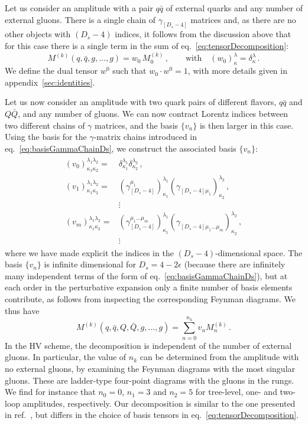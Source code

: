 Let us consider an amplitude with a pair $q\bar q$ of external
quarks and any number of external gluons. There is a single
chain of $\gamma_{[D_s-4]}$ matrices and,
as there are no other objects with $(D_s-4)$ indices, it
follows from the discussion above that
for this case there is a single term in the sum of
eq.~\eqref{eq:tensorDecomposition}:
\begin{equation}\label{eq:decompqqbar}
	M^{(k)}
	(q,\bar q,g,\ldots,g)
	=w_0\,M^{(k)}_0\,,\qquad
	\textrm{with}\quad
	(w_0)_{\kappa}^{\lambda}=\delta_{\kappa}^{\lambda}\,.
\end{equation}
We define the dual tensor
$w^0$ such that $w_0\cdot w^0=1$, with more details given in
appendix~\ref{sec:identities}.

Let us now consider an amplitude with two quark pairs of 
different flavors, $q\bar q$ and $Q\bar Q$, and any number of
gluons. We can now contract Lorentz indices between two 
different chains of $\gamma$ matrices, and the basis 
$\{v_n\}$ is then larger in this case. Using the basis for the
$\gamma$-matrix chains introduced in 
eq.~\eqref{eq:basisGammaChainDs}, we construct the associated
basis $\{v_n\}$:
\begin{align}
  \begin{split} \label{eqn:4qtensors}
    (v_0)_{\kappa_1\kappa_2}^{\lambda_1\lambda_2}   = &
    \delta_{\kappa_1}^{\lambda_1} \delta_{\kappa_2}^{\lambda_2}\,, \\
    (v_1)_{\kappa_1\kappa_2}^{\lambda_1\lambda_2}=
    &(\gamma_{[D_s-4]}^{\mu_1} )_{\kappa_1}^{\lambda_1} 
    (\gamma_{[D_s-4]\mu_1}^{\phantom{\mu}})_{\kappa_2}^{\lambda_2}\,, \\
    & \vdots\\
    (v_m)_{\kappa_1\kappa_2}^{\lambda_1\lambda_2}=
    &(\gamma_{[D_s-4]}^{\mu_1 \ldots  \mu_m})_{\kappa_1}^{\lambda_1}
    (\gamma_{[D_s-4]\mu_1 \ldots \mu_m}^{\phantom{\mu}})_{\kappa_2}^{\lambda_2}\,,\\
    & \vdots\,
  \end{split}
\end{align}
where we have made explicit the indices in the $
(D_s-4)$-dimensional space.
The basis $\{v_n\}$ is infinite dimensional for
$D_s=4-2\epsilon$ (because there are infinitely many independent
terms of the form of eq.~\eqref{eq:basisGammaChainDs}), but at
each order in the perturbative
expansion only a finite number of basis elements contribute, 
as follows from inspecting the corresponding Feynman diagrams.
We thus have
\begin{equation} \label{eqn:4qampltensor}
	M^{(k)} (q,\bar q,Q,\bar Q,g,\ldots,g) =\sum_{n=0}^{n_k} v_n M^{(k)}_n\,.
\end{equation}
In the HV scheme, the decomposition is independent of the number
of external gluons. In particular,
the value of $n_k$ can be determined from the amplitude with no 
external gluons, by examining the Feynman diagrams
with the most singular gluons. 
These are ladder-type four-point diagrams with the 
gluons in the rungs. We find for instance that $n_0=0$,
$n_1=3$ and $n_2=5$ for tree-level, one- and two-loop
amplitudes, respectively. Our decomposition is similar to the 
one presented in ref.~\cite{Glover:2004si}, but differs in the
choice of basis tensors in eq.~\eqref{eq:tensorDecomposition}.


